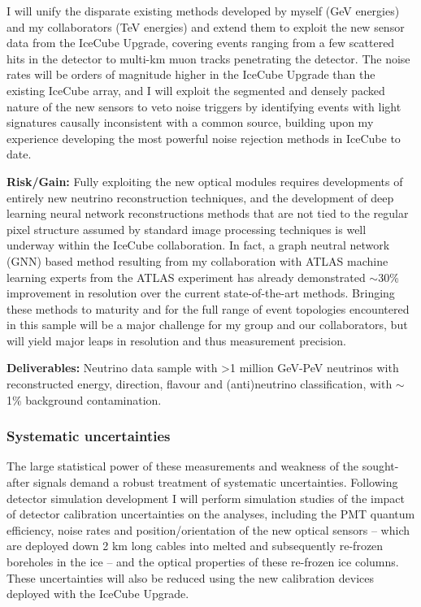 \documentclass[a4paper,11pt]{article}
\begin{document}
I will unify the disparate existing methods developed by myself (GeV energies) and my collaborators (TeV energies) and extend them to exploit the new sensor data from the IceCube Upgrade, covering events ranging from a few scattered hits in the detector to multi-km muon tracks penetrating the detector. The noise rates will be orders of magnitude higher in the IceCube Upgrade than the existing IceCube array, and I will exploit the segmented and densely packed nature of the new sensors to veto noise triggers by identifying events with light signatures causally inconsistent with a common source, building upon my experience developing the most powerful noise rejection methods in IceCube to date.

\textbf{Risk/Gain:} Fully exploiting the new optical modules requires developments of entirely new neutrino reconstruction techniques, and the development of deep learning neural network reconstructions methods that are not tied to the regular pixel structure assumed by standard image processing techniques is well underway within the IceCube collaboration. In fact, a graph neutral network (GNN) based method resulting from my collaboration with ATLAS machine learning experts from the ATLAS experiment has already demonstrated $\sim$30\% improvement in resolution over the current state-of-the-art methods. Bringing these methods to maturity and for the full range of event topologies encountered in this sample will be a major challenge for my group and our collaborators, but will yield major leaps in resolution and thus measurement precision.

\textbf{Deliverables:} Neutrino data sample with >1 million GeV-PeV neutrinos with reconstructed energy, direction, flavour and (anti)neutrino classification, with $\sim$1\% background contamination. \\

\subsubsection{Systematic uncertainties}

The large statistical power of these measurements and weakness of the sought-after signals demand a robust treatment of systematic uncertainties. Following detector simulation development I will perform simulation studies of the impact of detector calibration uncertainties on the analyses, including the PMT quantum efficiency, noise rates and position/orientation of the new optical sensors -- which are deployed down 2 km long cables into melted and subsequently re-frozen boreholes in the ice -- and the optical properties of these re-frozen ice columns. These uncertainties will also be reduced using the new calibration devices deployed with the IceCube Upgrade.
\end{document}
